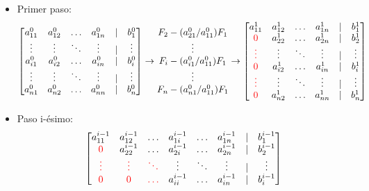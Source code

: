 \begin{itemize}
    \item Primer paso:
    \[
    \begin{bmatrix}
    a_{11}^{0} & a_{12}^{0} & \ldots & a_{1n}^{0} & | & b_{1}^{0} \\
    \vdots & \vdots & \ddots & \vdots & | & \vdots \\
    a_{i1}^{0} & a_{i2}^{0} & \ldots & a_{in}^{0} & | & b_{i}^{0} \\
    \vdots & \vdots & \ddots & \vdots & | & \vdots \\
    a_{n1}^{0} & a_{n2}^{0} & \ldots & a_{nn}^{0} & | & b_{n}^{0}
    \end{bmatrix}
    \to
    \begin{matrix}
    F_2 - (a_{21}^{0}/a_{11}^{0})F_1 \\
    \vdots \\
    F_i - (a_{i1}^{0}/a_{11}^{0})F_1 \\
    \vdots \\
    F_n - (a_{n1}^{0}/a_{11}^{0})F_1
    \end{matrix}
    \to
    \begin{bmatrix}
    a_{11}^{1} & a_{12}^{1} & \ldots & a_{1n}^{1} & | & b_{1}^{1} \\
    \textcolor{red}{0} & a_{22}^{1} & \ldots & a_{2n}^{1} & | & b_{2}^{1} \\
    \textcolor{red}{\vdots} & \vdots & \ddots & \vdots & | & \vdots \\
    \textcolor{red}{0} & a_{i2}^{1} & \ldots & a_{in}^{1} & | & b_{i}^{1} \\
    \textcolor{red}{\vdots} & \vdots & \ddots & \vdots & | & \vdots \\
    \textcolor{red}{0} & a_{n2}^{1} & \ldots & a_{nn}^{1} & | & b_{n}^{1}
    \end{bmatrix}
    \]
    \item Paso i-ésimo:
    \[
    \begin{bmatrix}
    a_{11}^{i-1} & a_{12}^{i-1} & \ldots & a_{1i}^{i-1} & \ldots & a_{1n}^{i-1} & | & b_{1}^{i-1} \\
    \textcolor{red}{0} & a_{22}^{i-1} & \ldots & a_{2i}^{i-1} & \ldots  & a_{2n}^{i-1} & | & b_{2}^{i-1} \\
    \textcolor{red}{\vdots} & \textcolor{red}{\vdots} & \textcolor{red}{\ddots} & \vdots & \ddots  & \vdots & | & \vdots \\
    \textcolor{red}{0} & \textcolor{red}{0} & \textcolor{red}{\ldots} & a_{ii}^{i-1} & \ldots & a_{in}^{i-1} & | & b_{i}^{i-1} \\

\end{bmatrix}\]
\end{itemize}
